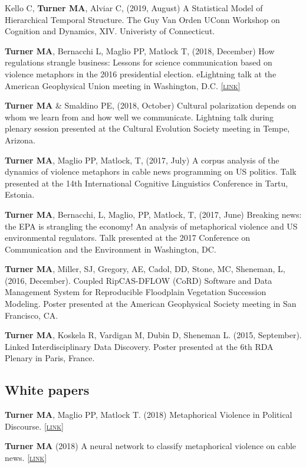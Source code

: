 \documentclass[11pt, letterpaper]{article}
\newcommand{\lurl}[1]{\href{#1}{\scriptsize\textsc{[link]}}}
\begin{document}
Kello C, \textbf{Turner MA}, Alviar C, (2019, August) A Statistical Model of
Hierarchical Temporal Structure. The Guy Van Orden UConn Workshop on Cognition
and Dynamics, XIV. Univeristy of Connecticut.

\textbf{Turner MA}, Bernacchi L, Maglio PP, Matlock T, (2018, December) How regulations
strangle business: Lessons for science communication based on violence metaphors in the 2016
presidential election. eLightning talk at the American Geophysical Union meeting in Washington,
D.C. \lurl{https://agu.confex.com/agu/fm18/meetingapp.cgi/Paper/451955}

\textbf{Turner MA} \& Smaldino PE, (2018, October) Cultural polarization depends on whom we learn from and how well we communicate. Lightning talk during plenary session presented at the Cultural Evolution Society meeting in Tempe, Arizona.

\textbf{Turner MA}, Maglio PP, Matlock, T, (2017, July) A corpus analysis of the dynamics of violence metaphors in cable news programming on US politics. Talk presented at the 14th International Cognitive Linguistics Conference in Tartu, Estonia.

\textbf{Turner MA}, Bernacchi, L, Maglio, PP, Matlock, T, (2017, June) Breaking
news: the EPA is strangling the economy! An analysis of metaphorical violence
and US environmental regulators. Talk presented at the 2017 Conference on
Communication and the Environment in Washington, DC.

\textbf{Turner MA}, Miller, SJ, Gregory, AE, Cadol, DD, Stone, MC, Sheneman, L, (2016, December). Coupled RipCAS-DFLOW (CoRD) Software and Data Management System for Reproducible Floodplain Vegetation Succession Modeling. Poster presented at the American Geophysical Society meeting in San Francisco, CA.

\textbf{Turner MA}, Koskela R, Vardigan M, Dubin D, Sheneman L. (2015, September). Linked Interdisciplinary Data Discovery. Poster presented at the 6th RDA Plenary in Paris, France. 


\subsection{White papers}

  \textbf{Turner MA}, Maglio PP, Matlock T. (2018) Metaphorical Violence in Political Discourse. 
  \lurl{https://doi.org/10.31235/osf.io/t8yg9}

  \textbf{Turner MA} (2018) A neural network to classify metaphorical violence
  on cable news. \lurl{https://arxiv.org/abs/1810.08677}
\end{document}
